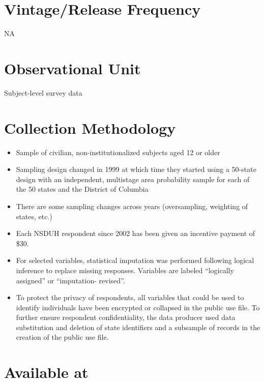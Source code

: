\documentclass[
]{book}
\providecommand{\tightlist}{%
  \setlength{\itemsep}{0pt}\setlength{\parskip}{0pt}}
\begin{document}
\hypertarget{vintagerelease-frequency-65}{%
\section{Vintage/Release Frequency}\label{vintagerelease-frequency-65}}

NA

\hypertarget{observational-unit-65}{%
\section{Observational Unit}\label{observational-unit-65}}

Subject-level survey data

\hypertarget{collection-methodology-65}{%
\section{Collection Methodology}\label{collection-methodology-65}}

\begin{itemize}
\tightlist
\item
  Sample of civilian, non-institutionalized subjects aged 12 or older
\item
  Sampling design changed in 1999 at which time they started using a 50-state design with an independent, multistage area probability sample for each of the 50 states and the District of Columbia
\item
  There are some sampling changes across years (oversampling, weighting of states, etc.)
\item
  Each NSDUH respondent since 2002 has been given an incentive payment of \$30.
\item
  For selected variables, statistical imputation was performed following logical inference to replace missing responses. Variables are labeled ``logically assigned'' or ``imputation- revised''.
\item
  To protect the privacy of respondents, all variables that could be used to identify individuals have been encrypted or collapsed in the public use file. To further ensure respondent confidentiality, the data producer used data substitution and deletion of state identifiers and a subsample of records in the creation of the public use file.
\end{itemize}

\hypertarget{available-at-65}{%
\section{Available at}\label{available-at-65}}
\end{document}
